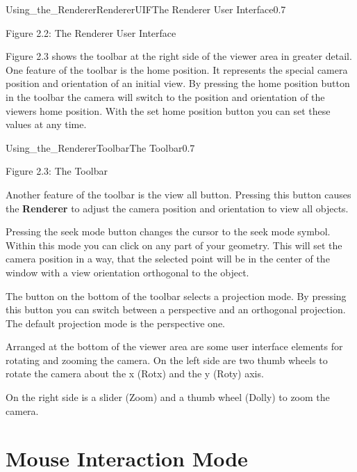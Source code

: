 \begin{covimg}{Using_the_Renderer}{RendererUIF}{The Renderer User Interface}{0.7}\end{covimg}
\begin{htmlonly}
Figure 2.2: The Renderer User Interface
\vspace{0.5cm}
\end{htmlonly}

Figure 2.3 shows the toolbar at the right side of the viewer area in greater detail. One 
feature of the toolbar is the home position. It represents the special camera position and 
orientation of an initial view. By pressing the home position button in the toolbar the 
camera will switch to the position and orientation of the viewers home position. With the set
home position button you can set these values at any time.

\begin{covimg}{Using_the_Renderer}{Toolbar}{The Toolbar}{0.7}\end{covimg}
\begin{htmlonly}
Figure 2.3: The Toolbar
\vspace{0.5cm}
\end{htmlonly}

Another feature of the toolbar is the view all button. Pressing this button causes the 
{\bf Renderer} to adjust the camera position and orientation to view all objects. 

Pressing the seek mode button changes the cursor to the seek mode symbol. Within this mode 
you can click on any part of your geometry. This will set the camera position in a way, 
that the selected point will be in the center of the window with a view orientation 
orthogonal to the object. 

The button on the bottom of the toolbar selects a projection mode. By pressing this button 
you can switch between a perspective and an orthogonal projection. The default projection 
mode is the perspective one.

Arranged at the bottom of the viewer area are some user interface elements for rotating 
and zooming the camera. On the left side are two thumb wheels to rotate the camera about 
the x (Rotx) and the y (Roty) axis. 

On the right side is a slider (Zoom) and a thumb wheel (Dolly) to zoom the camera.


\clearpage
\section{Mouse Interaction Mode}

